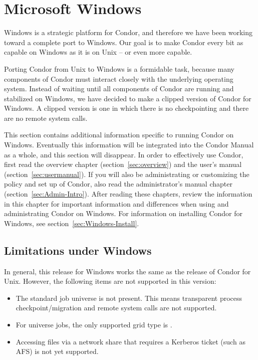 \section{\label{sec:platform-windows}Microsoft Windows}

Windows is a strategic platform for Condor,
and therefore we have been working toward a complete
port to Windows.
Our goal is to make Condor every bit as capable on Windows as it is on
Unix -- or even more capable.

Porting Condor from Unix to Windows is a formidable task,
because many
components of Condor must interact closely with the underlying operating
system.
Instead of waiting until all components of Condor are running
and stabilized on Windows,
we have decided to make a clipped version of Condor for Windows.
A clipped version is one in which there is no checkpointing
and there are no remote system calls.

This section contains additional information specific to running
Condor on Windows.  Eventually this information will be integrated
into the Condor Manual as a whole, and this section will disappear.
In order to effectively use Condor, first read the overview
chapter (section~\ref{sec:overview})
and the user's manual (section~\ref{sec:usermanual}).
If you will
also be administrating or customizing the policy and set up of Condor,
also read the administrator's manual 
chapter (section~\ref{sec:Admin-Intro}).
After reading these chapters,
review the information in this chapter for
important information and differences when using and administrating
Condor on Windows.
For information on installing Condor for Windows, see
section~\ref{sec:Windows-Install}.



\subsection{Limitations under Windows}

In general, this release for Windows works the same as the 
release of Condor for Unix.
However, the following items are not supported in this version:

\begin{itemize}

\item The standard job universe is not present.  This means
transparent process checkpoint/migration and remote system calls are
not supported.

\item For  universe jobs, the only supported grid type is
.

\item Accessing files via a network share that requires a Kerberos ticket
(such as AFS) is not yet supported.

\end{itemize}

